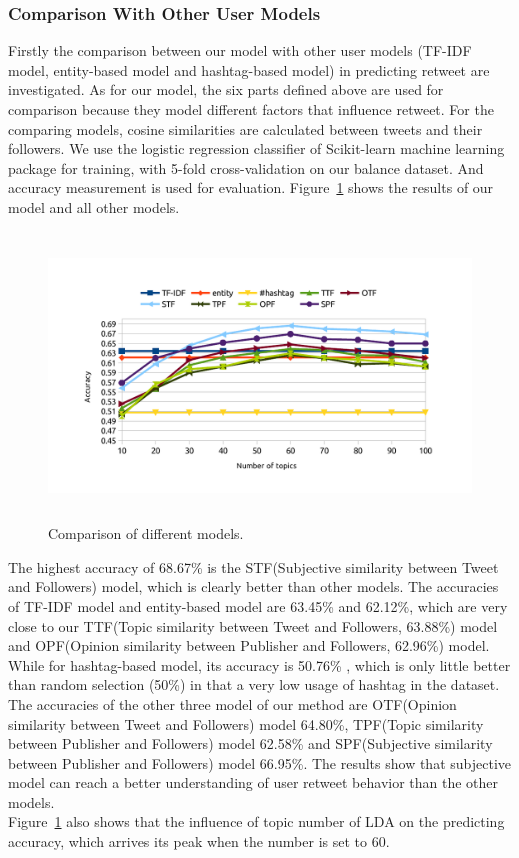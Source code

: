 \documentclass[preprint]{elsarticle}
\begin{document}
\subsubsection{Comparison With Other User Models}
\label{comparison}
Firstly the comparison between our model with other user models (TF-IDF model\cite{Luo:2013RMF}, entity-based model and hashtag-based model\cite{Abel:2011AUM}) in predicting retweet are investigated.
As for our model, the six parts defined above are used for comparison because they model different factors that influence retweet.
For the comparing models, cosine similarities are calculated between tweets and their followers.
We use the logistic regression classifier of Scikit-learn machine learning package\cite{scikit-learn} for training, with 5-fold cross-validation on our balance dataset.
And accuracy measurement is used for evaluation.
Figure~\ref{fig:graph7} shows the results of our model and all other models.
\begin{figure}[htb]
\setlength{\belowcaptionskip}{-0.2cm} 
\centering
\includegraphics[width=4.5in,height=3.0in]{comparison.pdf}
\vspace{-4em}\caption{Comparison of different models.}
\label{fig:graph7}
\end{figure}
The highest accuracy of 68.67\% is the STF(Subjective similarity between Tweet and Followers) model, which is clearly better than other models. 
The accuracies of TF-IDF model and entity-based model are 63.45\% and 62.12\%, which are very close to our TTF(Topic similarity between Tweet and Followers, 63.88\%) model and OPF(Opinion similarity between Publisher and Followers, 62.96\%) model.
While for hashtag-based model, its accuracy is  50.76\% , which is only little better than random selection (50\%) in that a very low usage of hashtag in the dataset.
The accuracies of the other three model of our method are OTF(Opinion similarity between Tweet and Followers) model 64.80\%, TPF(Topic similarity between Publisher and Followers) model 62.58\% and SPF(Subjective similarity between Publisher and Followers) model 66.95\%.
The results show that subjective model can reach a better understanding of user retweet behavior than the other models.\\
Figure~\ref{fig:graph7} also shows that the influence of topic number of LDA on the predicting accuracy, which arrives its peak when the number is set to 60.
\end{document}
